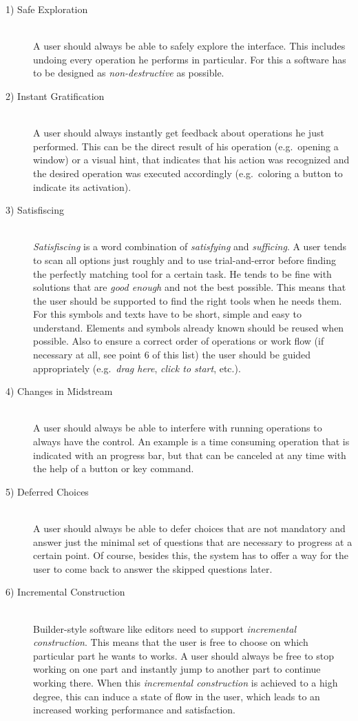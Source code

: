 \documentclass[twoside, openright, 12pt]{book}
\begin{document}
\begin{description}
\item[1) Safe Exploration]\hfill \\
A user should always be able to safely explore the interface.
This includes undoing every operation he performs in particular.
For this a software has to be designed as \textit{non-destructive} as possible.

\item[2) Instant Gratification]\hfill \\
A user should always instantly get feedback about operations he just performed.
This can be the direct result of his operation (e.g.~opening a window) or a visual hint, that indicates that his action was recognized and the desired operation was executed accordingly (e.g.~coloring a button to indicate its activation).

\item[3) Satisfiscing]\hfill \\
\textit{Satisfiscing} is a word combination of \textit{satisfying} and \textit{sufficing}.
A user tends to scan all options just roughly and to use trial-and-error before finding the perfectly matching tool for a certain task.
He tends to be fine with solutions that are \textit{good enough} and not the best possible.
This means that the user should be supported to find the right tools when he needs them.
For this symbols and texts have to be short, simple and easy to understand.
Elements and symbols already known should be reused when possible.
Also to ensure a correct order of operations or work flow (if necessary at all, see point 6 of this list) the user should be guided appropriately (e.g.~\textit{drag here}, \textit{click to start}, etc.).

\item[4) Changes in Midstream]\hfill \\
A user should always be able to interfere with running operations to always have the control.
An example is a time consuming operation that is indicated with an progress bar, but that can be canceled at any time with the help of a button or key command.

\item[5) Deferred Choices]\hfill \\
A user should always be able to defer choices that are not mandatory and answer just the minimal set of questions that are necessary to progress at a certain point.
Of course, besides this, the system has to offer a way for the user to come back to answer the skipped questions later.

\item[6) Incremental Construction]\hfill \\
Builder-style software like editors need to support \textit{incremental construction}.
This means that the user is free to choose on which particular part he wants to works.
A user should always be free to stop working on one part and instantly jump to another part to continue working there.
When this \textit{incremental construction} is achieved to a high degree, this can induce a state of flow in the user, which leads to an increased working performance and satisfaction.
\end{description}
\end{document}
